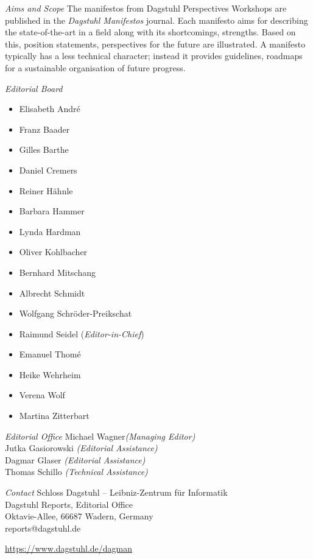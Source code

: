 \documentclass[a4paper,USenglish]{dagman-master-v2021}
\begin{document}
\begin{publicationinfo}
\bigskip
\bigskip


\emph{Aims and Scope}\newline
The manifestos from Dagstuhl Perspectives Workshops are published in the \emph{Dagstuhl Manifestos} journal. Each manifesto aims for describing the state-of-the-art in a field along with its shortcomings, strengths. Based on this, position statements, perspectives for the future are illustrated. A manifesto typically has a less technical character; instead it provides guidelines, roadmaps for a sustainable organisation of future progress. 

\bigskip
\bigskip

\emph{Editorial Board}
\begin{itemize}
\item Elisabeth Andr\'{e}
\item Franz Baader
\item Gilles Barthe
\item Daniel Cremers
\item Reiner H\"ahnle
\item Barbara Hammer
\item Lynda Hardman
\item Oliver Kohlbacher
\item Bernhard Mitschang
\item Albrecht Schmidt
\item Wolfgang Schr\"{o}der-Preikschat
\item Raimund Seidel (\emph{Editor-in-Chief})
\item Emanuel Thom\'{e}
\item Heike Wehrheim
\item Verena Wolf
\item Martina Zitterbart
\end{itemize}

\medskip
\emph{Editorial Office}\newline
Michael Wagner\emph{(Managing Editor)}\\
Jutka Gasiorowski \emph{(Editorial Assistance)}\\
Dagmar Glaser \emph{(Editorial Assistance)}\\
Thomas Schillo \emph{(Technical Assistance)}

\medskip
\emph{Contact}\newline
Schloss Dagstuhl -- Leibniz-Zentrum f\"ur Informatik\\
Dagstuhl Reports, Editorial Office\\
Oktavie-Allee, 66687 Wadern, Germany\\ 
reports@dagstuhl.de


\vfill

\href{https://www.dagstuhl.de/dagman}{https://www.dagstuhl.de/dagman}

  
\end{publicationinfo}
\end{document}
